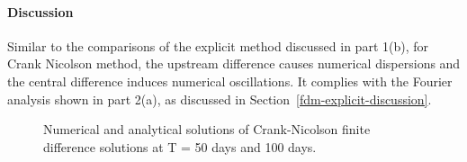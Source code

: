 \paragraph{Discussion} Similar to the comparisons of the explicit method discussed in part 1(b), for Crank Nicolson method, the upstream difference causes numerical dispersions and the central difference induces numerical oscillations. It complies with the Fourier analysis shown in part 2(a), as discussed in Section~\ref{fdm-explicit-discussion}.

\begin{figure}[!htbp]
    \centering
    \qquad
    \caption{Numerical and analytical solutions of Crank-Nicolson finite difference solutions at T = 50 days and 100 days.}
    \label{fig:4}
\end{figure}

